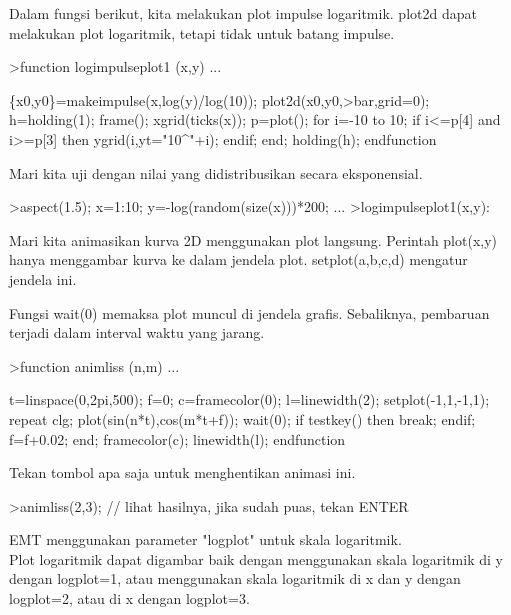 \documentclass[a4paper,10pt]{article}
\begin{document}
\begin{eulernotebook}
\begin{eulercomment}
\begin{eulercomment}
\begin{eulercomment}
\begin{eulercomment}
\begin{eulercomment}
\begin{eulercomment}
\begin{eulercomment}
Dalam fungsi berikut, kita melakukan plot impulse logaritmik. plot2d
dapat melakukan plot logaritmik, tetapi tidak untuk batang impulse.
\end{eulercomment}
\begin{eulerprompt}
>function logimpulseplot1 (x,y) ...
\end{eulerprompt}
\begin{eulerudf}
    \{x0,y0\}=makeimpulse(x,log(y)/log(10));
    plot2d(x0,y0,>bar,grid=0);
    h=holding(1);
    frame();
    xgrid(ticks(x));
    p=plot();
    for i=-10 to 10;
      if i<=p[4] and i>=p[3] then
         ygrid(i,yt="10^"+i);
      endif;
    end;
    holding(h);
  endfunction
\end{eulerudf}
\begin{eulercomment}
Mari kita uji dengan nilai yang didistribusikan secara eksponensial.
\end{eulercomment}
\begin{eulerprompt}
>aspect(1.5); x=1:10; y=-log(random(size(x)))*200; ...
>logimpulseplot1(x,y):
\end{eulerprompt}
\begin{eulercomment}
Mari kita animasikan kurva 2D menggunakan plot langsung. Perintah
plot(x,y) hanya menggambar kurva ke dalam jendela plot.
setplot(a,b,c,d) mengatur jendela ini.

Fungsi wait(0) memaksa plot muncul di jendela grafis. Sebaliknya,
pembaruan terjadi dalam interval waktu yang jarang.
\end{eulercomment}
\begin{eulerprompt}
>function animliss (n,m) ...
\end{eulerprompt}
\begin{eulerudf}
  t=linspace(0,2pi,500);
  f=0;
  c=framecolor(0);
  l=linewidth(2);
  setplot(-1,1,-1,1);
  repeat
    clg;
    plot(sin(n*t),cos(m*t+f));
    wait(0);
    if testkey() then break; endif;
    f=f+0.02;
  end;
  framecolor(c);
  linewidth(l);
  endfunction
\end{eulerudf}
\begin{eulercomment}
Tekan tombol apa saja untuk menghentikan animasi ini.
\end{eulercomment}
\begin{eulerprompt}
>animliss(2,3); // lihat hasilnya, jika sudah puas, tekan ENTER
\end{eulerprompt}
\begin{eulercomment}
EMT menggunakan parameter "logplot" untuk skala logaritmik.\\
Plot logaritmik dapat digambar baik dengan menggunakan skala
logaritmik di y dengan logplot=1, atau menggunakan skala logaritmik di
x dan y dengan logplot=2, atau di x dengan logplot=3.


\end{eulercomment}
\end{eulercomment}
\end{eulercomment}
\end{eulercomment}
\end{eulercomment}
\end{eulercomment}
\end{eulercomment}
\end{eulernotebook}
\end{document}
